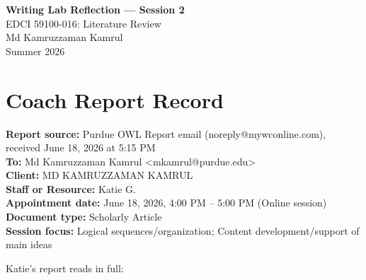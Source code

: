 \documentclass[11pt]{article}
\begin{document}
\begin{center}
{\Large \textbf{Writing Lab Reflection --- Session 2}}\\[0.35em]
EDCI 59100-016: Literature Review\\
Md Kamruzzaman Kamrul\\
Summer 2026
\end{center}

\vspace{0.5em}

\section*{Coach Report Record}

\noindent\textbf{Report source:} Purdue OWL Report email (noreply@mywconline.com), received June 18, 2026 at 5:15 PM\\
\textbf{To:} Md Kamruzzaman Kamrul \textless mkamrul@purdue.edu\textgreater\\
\textbf{Client:} MD KAMRUZZAMAN KAMRUL\\
\textbf{Staff or Resource:} Katie G.\\
\textbf{Appointment date:} June 18, 2026, 4:00 PM -- 5:00 PM (Online session)\\
\textbf{Document type:} Scholarly Article\\
\textbf{Session focus:} Logical sequences/organization; Content development/support of main ideas

\medskip

\noindent Katie's report reads in full:
\end{document}

